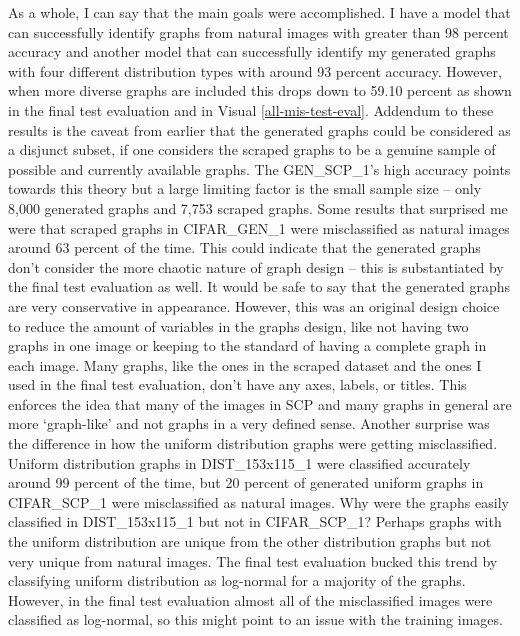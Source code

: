 \documentclass[12pt]{article}
\begin{document}
            As a whole, I can say that the main goals were accomplished. 
            I have a model that can successfully identify graphs from natural images 
            with greater than 98 percent accuracy and another model that can successfully identify my generated graphs 
            with four different distribution types with around 93 percent accuracy. 
            However, when more diverse graphs are included this drops down to 59.10 percent as shown in the 
            final test evaluation and in Visual \ref{all-mis-test-eval}.
            Addendum to these results is the caveat from earlier that the generated graphs could be considered as a disjunct subset, 
            if one considers the scraped graphs to be a genuine sample of possible and currently available graphs. 
            The GEN\_SCP\_1’s high accuracy points towards this theory but a large limiting factor is the small sample size -- 
            only 8,000 generated graphs and 7,753 scraped graphs. 
            Some results that surprised me were that scraped graphs in CIFAR\_GEN\_1 were misclassified as natural images 
            around 63 percent of the time. This could indicate 
            that the generated graphs don’t consider the more chaotic nature of graph design -- 
            this is substantiated by the final test evaluation as well.
            It would be safe to say that the generated graphs are very conservative in appearance. 
            However, this was an original design choice to reduce the amount of variables in the graphs design, 
            like not having two graphs in one image or keeping to the standard of having a complete graph in each image. 
            Many graphs, like the ones in the scraped dataset 
            and the ones I used in the final test evaluation, don’t have any axes, labels, or titles. 
            This enforces the idea that many of the images in SCP and many graphs in general are more ‘graph-like’ 
            and not graphs in a very defined sense.
            Another surprise was the difference in how the uniform distribution graphs were getting misclassified.
            Uniform distribution graphs in DIST\_153x115\_1 were classified accurately around 99 percent of the time, 
            but 20 percent of generated uniform graphs in CIFAR\_SCP\_1 were misclassified as natural images. 
            Why were the graphs easily classified in DIST\_153x115\_1 but not in CIFAR\_SCP\_1? 
            Perhaps graphs with the uniform distribution are unique from the other distribution graphs 
            but not very unique from natural images. The final test evaluation bucked this trend by
            classifying uniform distribution as log-normal for a majority of the graphs.
            However, in the final test evaluation almost all of the misclassified images were
            classified as log-normal, so this might point to an issue with the training images.
            
\end{document}
